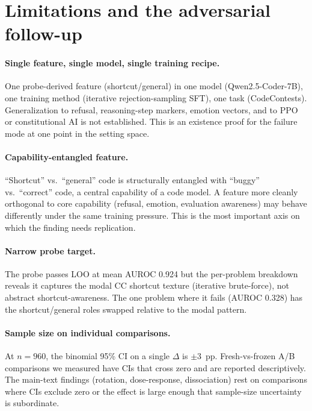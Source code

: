 \documentclass[11pt]{article}
\begin{document}
\section{Limitations and the adversarial follow-up}
\label{sec:limitations}

\paragraph{Single feature, single model, single training recipe.} One
probe-derived feature (shortcut/general) in one model
(Qwen2.5-Coder-7B), one training method (iterative rejection-sampling
SFT), one task (CodeContests). Generalization to refusal, reasoning-step
markers, emotion vectors, and to PPO or constitutional AI is not
established. This is an existence proof for the failure mode at one
point in the setting space.

\paragraph{Capability-entangled feature.} ``Shortcut'' vs.\ ``general''
code is structurally entangled with ``buggy'' vs.\ ``correct'' code, a
central capability of a code model. A feature more cleanly orthogonal
to core capability (refusal, emotion, evaluation awareness) may behave
differently under the same training pressure. This is the most
important axis on which the finding needs replication.

\paragraph{Narrow probe target.} The probe passes LOO at mean AUROC
0.924 but the per-problem breakdown reveals it captures the modal CC
shortcut texture (iterative brute-force), not abstract
shortcut-awareness. The one problem where it fails (AUROC 0.328) has
the shortcut/general roles swapped relative to the modal pattern.

\paragraph{Sample size on individual comparisons.} At $n{=}960$, the
binomial 95\% CI on a single $\Delta$ is $\pm 3$~pp. Fresh-vs-frozen
A/B comparisons we measured have CIs that cross zero and are reported
descriptively. The main-text findings (rotation, dose-response,
dissociation) rest on comparisons where CIs exclude zero or the
effect is large enough that sample-size uncertainty is subordinate.
\end{document}
